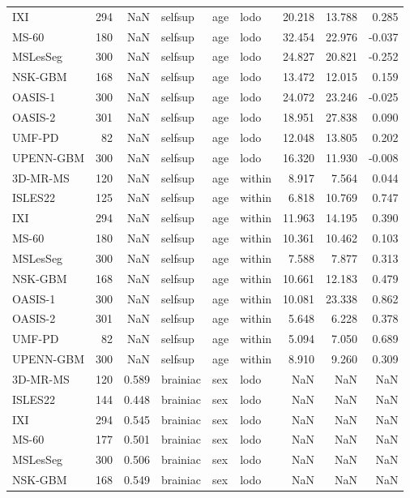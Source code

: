 \begin{tabular}{lrrlllrrr}
IXI & 294 & NaN & selfsup & age & lodo & 20.218 & 13.788 & 0.285 \\
MS-60 & 180 & NaN & selfsup & age & lodo & 32.454 & 22.976 & -0.037 \\
MSLesSeg & 300 & NaN & selfsup & age & lodo & 24.827 & 20.821 & -0.252 \\
NSK-GBM & 168 & NaN & selfsup & age & lodo & 13.472 & 12.015 & 0.159 \\
OASIS-1 & 300 & NaN & selfsup & age & lodo & 24.072 & 23.246 & -0.025 \\
OASIS-2 & 301 & NaN & selfsup & age & lodo & 18.951 & 27.838 & 0.090 \\
UMF-PD & 82 & NaN & selfsup & age & lodo & 12.048 & 13.805 & 0.202 \\
UPENN-GBM & 300 & NaN & selfsup & age & lodo & 16.320 & 11.930 & -0.008 \\
3D-MR-MS & 120 & NaN & selfsup & age & within & 8.917 & 7.564 & 0.044 \\
ISLES22 & 125 & NaN & selfsup & age & within & 6.818 & 10.769 & 0.747 \\
IXI & 294 & NaN & selfsup & age & within & 11.963 & 14.195 & 0.390 \\
MS-60 & 180 & NaN & selfsup & age & within & 10.361 & 10.462 & 0.103 \\
MSLesSeg & 300 & NaN & selfsup & age & within & 7.588 & 7.877 & 0.313 \\
NSK-GBM & 168 & NaN & selfsup & age & within & 10.661 & 12.183 & 0.479 \\
OASIS-1 & 300 & NaN & selfsup & age & within & 10.081 & 23.338 & 0.862 \\
OASIS-2 & 301 & NaN & selfsup & age & within & 5.648 & 6.228 & 0.378 \\
UMF-PD & 82 & NaN & selfsup & age & within & 5.094 & 7.050 & 0.689 \\
UPENN-GBM & 300 & NaN & selfsup & age & within & 8.910 & 9.260 & 0.309 \\
3D-MR-MS & 120 & 0.589 & brainiac & sex & lodo & NaN & NaN & NaN \\
ISLES22 & 144 & 0.448 & brainiac & sex & lodo & NaN & NaN & NaN \\
IXI & 294 & 0.545 & brainiac & sex & lodo & NaN & NaN & NaN \\
MS-60 & 177 & 0.501 & brainiac & sex & lodo & NaN & NaN & NaN \\
MSLesSeg & 300 & 0.506 & brainiac & sex & lodo & NaN & NaN & NaN \\
NSK-GBM & 168 & 0.549 & brainiac & sex & lodo & NaN & NaN & NaN \\

\end{tabular}
